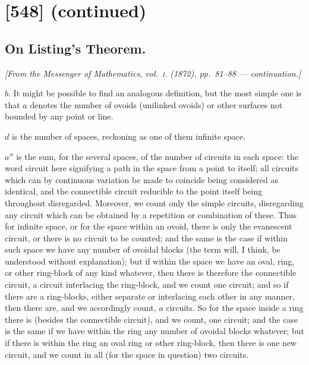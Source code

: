 \documentclass[11pt,a4paper]{article}
\theoremstyle{plain}
\theoremstyle{definition}
\begin{document}
\section{[548] (continued)}
\subsection{On Listing's Theorem.}

\begin{center}
\textit{[From the Messenger of Mathematics, vol.~\textsc{i}. (1872), pp.~81--88 --- continuation.]}
\end{center}

\noindent
$b.$ It might be possible to find an analogous definition, but the most simple one
is that $a$ denotes the number of ovoids (unilinked ovoids) or other surfaces not
bounded by any point or line.

$d$ is the number of spaces, reckoning as one of them infinite space.

$a''$ is the sum, for the several spaces, of the number of circuits in each space:
the word circuit here signifying a path in the space from a point to itself; all
circuits which can by continuous variation be made to coincide being considered as
identical, and the connectible circuit reducible to the point itself being throughout
disregarded. Moreover, we count only the simple circuits, disregarding any circuit which
can be obtained by a repetition or combination of these. Thus for infinite space, or
for the space within an ovoid, there is only the evanescent circuit, or there is no
circuit to be counted; and the same is the case if within such space we have any
number of ovoidal blocks (the term will, I think, be understood without explanation);
but if within the space we have an oval, ring, or other ring-block of any kind
whatever, then there is therefore the connectible circuit, a circuit interlacing the ring-block, and we count one circuit; and so if there are a ring-blocks, either separate or
interlacing each other in any manner, then there are, and we accordingly count,
$a$ circuits. So for the space inside a ring there is (besides the connectible circuit),
and we count, one circuit; and the case is the same if we have within the ring any
number of ovoidal blocks whatever; but if there is within the ring an oval ring or
other ring-block, then there is one new circuit, and we count in all (for the space
in question) two circuits.
\end{document}
